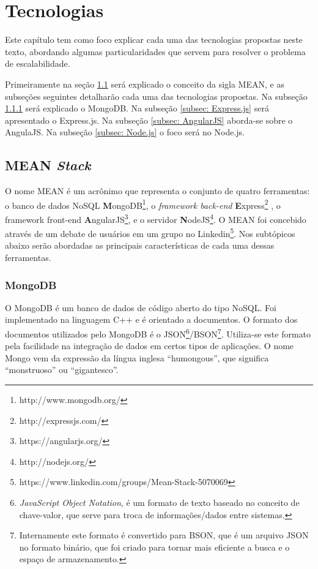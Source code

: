 \chapter{Tecnologias}
\label{tecnologias}
Este capítulo tem como foco explicar cada uma das tecnologias propostas neste texto, abordando algumas particularidades que servem para resolver o problema de escalabilidade. 

Primeiramente na seção \ref{sec: MEAN} será explicado o conceito da sigla MEAN, e as subseções seguintes detalharão cada uma das tecnologias propostas. Na subseção \ref{subsec: MongoDB} será explicado o MongoDB. Na subseção \ref{subsec: Express.js} será apresentado o Express.js. Na subseção \ref{subsec: AngularJS} aborda-se sobre o AngulaJS. Na subseção \ref{subsec: Node.js} o foco será no Node.js. 

\section{MEAN \textit{Stack}}
\label{sec: MEAN}
O nome MEAN é um acrônimo que representa o conjunto de quatro ferramentas:
o banco de dados NoSQL \textbf{M}ongoDB\footnote{http://www.mongodb.org/}, o \textit{framework back-end} \textbf{E}xpress\footnote{http://expressjs.com/} , o framework front-end \textbf{A}ngularJS\footnote{https://angularjs.org/}, e o servidor \textbf{N}odeJS\footnote{http://nodejs.org/}. O MEAN foi concebido através de um debate de usuários em um grupo no Linkedin\footnote{https://www.linkedin.com/groups/Mean-Stack-5070069}. Nos subtópicos abaixo serão abordadas as principais características de cada uma dessas ferramentas.

\subsection{MongoDB}
\label{subsec: MongoDB}
O MongoDB é um banco de dados de código aberto do tipo NoSQL. Foi implementado na linguagem  C++ e é orientado a documentos. O formato dos documentos utilizados pelo MongoDB é o JSON\footnote{\textit{JavaScript Object Notation}, é um formato de texto baseado no conceito de chave-valor, que serve para troca de informações/dados entre sistemas.}/BSON\footnote{Internamente este formato é convertido para BSON, que é um arquivo JSON no formato binário, que foi criado para tornar mais eficiente a busca e o espaço de armazenamento.}. Utiliza-se este formato pela facilidade na integração de dados em certos tipos de aplicações. O nome Mongo vem da expressão da língua inglesa ``humongous'',  que significa ``monstruoso'' ou ``gigantesco''. 

